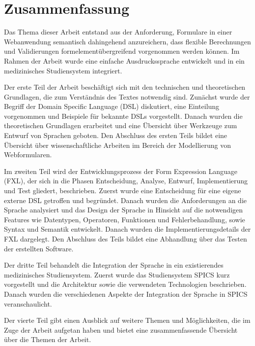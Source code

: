 


\chapter{Zusammenfassung}
\label{chapter_zusammenfassung}

Das Thema dieser Arbeit entstand aus der Anforderung, Formulare in einer Webanwendung semantisch dahingehend anzureichern, dass flexible Berechnungen und Validierungen formelementübergreifend vorgenommen werden können. Im Rahmen der Arbeit wurde eine einfache Ausdruckssprache entwickelt und in ein medizinisches Studiensystem integriert.

Der erste Teil der Arbeit beschäftigt sich mit den technischen und theoretischen Grundlagen, die zum Verständnis des Textes notwendig sind. Zunächst wurde der Begriff der Domain Specific Language (DSL) diskutiert, eine Einteilung vorgenommen und Beispiele für bekannte DSLs vorgestellt. Danach wurden die theoretischen Grundlagen erarbeitet und eine Übersicht über Werkzeuge zum Entwurf von Sprachen geboten. Den Abschluss des ersten Teils bildet eine Übersicht über wissenschaftliche Arbeiten im Bereich der Modellierung von Webformularen.

Im zweiten Teil wird der Entwicklungsprozess der Form Expression Language (FXL), der sich in die Phasen Entscheidung, Analyse, Entwurf, Implementierung und Test gliedert, beschrieben. Zuerst wurde eine Entscheidung für eine eigene externe DSL getroffen und begründet. Danach wurden die Anforderungen an die Sprache analysiert und das Design der Sprache in Hinsicht auf die notwendigen Features wie Datentypen, Operatoren, Funktionen und Fehlerbehandlung, sowie Syntax und Semantik entwickelt. Danach wurden die Implementierungsdetails der FXL dargelegt. Den Abschluss des Teils bildet eine Abhandlung über das Testen der erstellten Software.

Der dritte Teil behandelt die Integration der Sprache in ein existierendes medizinisches Studiensystem. Zuerst wurde das Studiensystem SPICS kurz vorgestellt und die Architektur sowie die verwendeten Technologien beschrieben. Danach wurden die verschiedenen Aspekte der Integration der Sprache in SPICS veranschaulicht.

Der vierte Teil gibt einen Ausblick auf weitere Themen und Möglichkeiten, die im Zuge der Arbeit aufgetan haben und bietet eine zusammenfassende Übersicht über die Themen der Arbeit.

